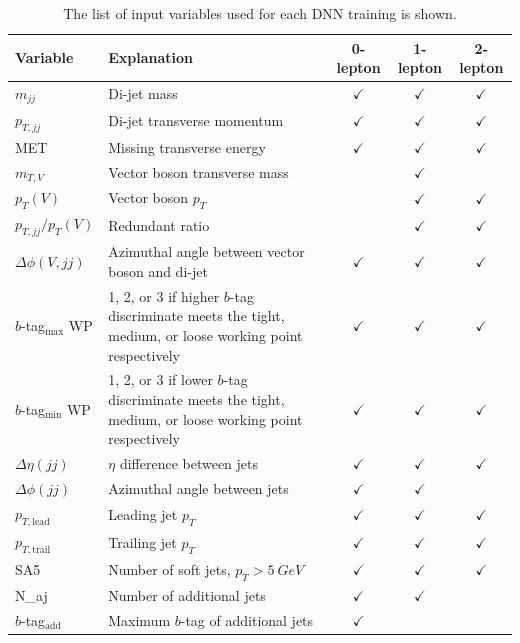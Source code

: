 \begin{table}
  \caption[Resolved DNN inputs]{
    The list of input variables used for each DNN training is shown.
  }
  \centering
  \begin{tabularx}{\textwidth}{|l|X|c|c|c|}
    \hline
    Variable & Explanation & 0-lepton & 1-lepton & 2-lepton \\
    \hline\hline
    $m_{jj}$ & Di-jet mass & $\checkmark$ & $\checkmark$ & $\checkmark$ \\
    $p_{T,jj}$ & Di-jet transverse momentum & $\checkmark$ & $\checkmark$ & $\checkmark$ \\
    MET & Missing transverse energy & $\checkmark$ & $\checkmark$ & $\checkmark$ \\
    \hline
    $m_{T,V}$ & Vector boson transverse mass & & $\checkmark$ & \\
    $p_T(V)$ & Vector boson $p_T$ & & $\checkmark$ & $\checkmark$ \\
    $p_{T,jj}/p_T(V)$ & Redundant ratio & & $\checkmark$ & $\checkmark$ \\
    \hline
    $\Delta\phi(V, jj)$ & Azimuthal angle between vector boson and di-jet & $\checkmark$ & $\checkmark$ & $\checkmark$ \\
    $b$-tag$_\mathrm{max}$ WP & 1, 2, or 3 if higher $b$-tag discriminate meets the tight, medium, or loose working point respectively & $\checkmark$ & $\checkmark$ & $\checkmark$ \\
    $b$-tag$_\mathrm{min}$ WP & 1, 2, or 3 if lower $b$-tag discriminate meets the tight, medium, or loose working point respectively & $\checkmark$ & $\checkmark$ & $\checkmark$ \\
    \hline
    $\Delta\eta(jj)$ & $\eta$ difference between jets & $\checkmark$ & $\checkmark$ & $\checkmark$ \\
    $\Delta\phi(jj)$ & Azimuthal angle between jets & $\checkmark$ & $\checkmark$ & \\
    $p_{T, \mathrm{lead}}$ & Leading jet $p_T$ & $\checkmark$ & $\checkmark$ & $\checkmark$ \\
    \hline
    $p_{T, \mathrm{trail}}$ & Trailing jet $p_T$ & $\checkmark$ & $\checkmark$ & $\checkmark$ \\
    SA5 & Number of soft jets, $p_T > \SI{5}{GeV}$ & $\checkmark$ & $\checkmark$ & $\checkmark$ \\
    N_{aj} & Number of additional jets & $\checkmark$ & $\checkmark$ & \\
    \hline
    $b$-tag$_\mathrm{add}$ & Maximum $b$-tag of additional jets & $\checkmark$ & & \\

\end{tabularx}
\end{table}
